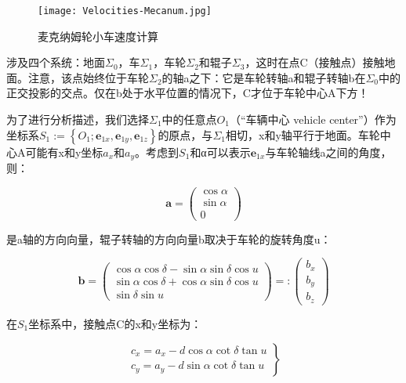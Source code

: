 \begin{figure}[htbp]
    \centering
    \texttt{[image: Velocities-Mecanum.jpg]}
    \caption{麦克纳姆轮小车速度计算}
    \label{fig:Velocities-Mecanum}
\end{figure}

涉及四个系统：地面$\Sigma_{0}$，车$\Sigma_{1}$，车轮$\Sigma_{2}$和辊子$\Sigma_{3}$，这时在点C（接触点）接触地面。注意，该点始终位于车轮$\Sigma_{2}$的轴a之下：它是车轮转轴a和辊子转轴b在$\Sigma_{0}$中的正交投影的交点。仅在b处于水平位置的情况下，C才位于车轮中心A下方！

为了进行分析描述，我们选择$\Sigma_{1}$中的任意点$O_{1}$（“车辆中心 vehicle center”）作为坐标系$S_{1}:=\left\{O_{1} ; \mathbf{e}_{1 x}, \mathbf{e}_{1 y}, \mathbf{e}_{1 z}\right\}$的原点，与$\Sigma_{1}$相切，x和y轴平行于地面。车轮中心A可能有x和y坐标$a_x$和$a_y$。考虑到$S_1$和α可以表示$\mathbf{e}_{1 x}$与车轮轴线a之间的角度，则：

\begin{equation}
    \mathbf{a}=\left(\begin{array}{c}
    {\cos \alpha} \\
    {\sin \alpha} \\
    {0}
    \end{array}\right)
\end{equation}

是a轴的方向向量，辊子转轴的方向向量b取决于车轮的旋转角度u：

\begin{equation}
    \mathbf{b}=\left(\begin{array}{c}
    {\cos \alpha \cos \delta-\sin \alpha \sin \delta \cos u} \\
    {\sin \alpha \cos \delta+\cos \alpha \sin \delta \cos u} \\
    {\sin \delta \sin u}
    \end{array}\right)=:\left(\begin{array}{l}
    {b_{x}} \\
    {b_{y}} \\
    {b_{z}}
    \end{array}\right)
\end{equation}

在$S_1$坐标系中，接触点C的x和y坐标为：

\begin{equation}
    \left.\begin{array}{l}
    {c_{x}=a_{x}-d \cos \alpha \cot \delta \tan u} \\
    {c_{y}=a_{y}-d \sin \alpha \cot \delta \tan u}
    \end{array}\right\}
\end{equation}


